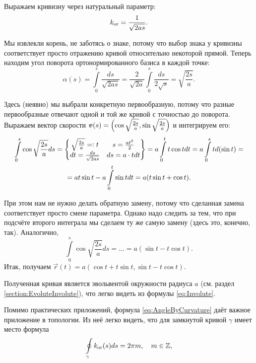 \begin{solution}
	Выражаем кривизну через натуральный параметр:
	\[
		k_{\mathrm{or}} = \frac{1}{\sqrt{2as}}.
	\]

	Мы извлекли корень, не заботясь о знаке, потому что выбор знака у кривизны соответствует просто отражению кривой относительно некоторой прямой. Теперь находим угол поворота ортонормированного базиса в каждой точке:
	\[
		\alpha(s) = \int\limits_0^s\frac{ds}{\sqrt{2as}} = \frac{2}{\sqrt{2a}}\int\limits_0^s\frac{ds}{2\sqrt{s}} = \sqrt{\frac{2s}{a}}.
	\]

	Здесь (неявно) мы выбрали конкретную первообразную, потому что разные первообразные отвечают одной и той же кривой с точностью до поворота. Выражаем вектор скорости $\boldsymbol{v}(s) = \left(\cos\sqrt{\frac{2s}{a}}, \sin\sqrt{\frac{2s}{a}}\right)$ и интегрируем его:
	\begin{multline*}
		\int\limits_0^s\cos\sqrt{\frac{2s}{a}}ds = \left\{
			\begin{matrix}
				\sqrt{\frac{2s}{a}} = \vcentcolon t & s = \frac{at^2}{2} \\
				dt = \frac{ds}{\sqrt{2as}} & ds = a \cdot t dt
			\end{matrix}
			\right\} = a\int\limits_0^tt\cos t dt = a\int\limits_0^std(\sin t) =\\ = a t\sin t - a\int\limits_0^t\sin tdt = a(t\sin t + \cos t).
	\end{multline*}

	При этом нам не нужно делать обратную замену, потому что сделанная замена соответствует просто смене параметра. Однако надо следить за тем, что при подсчёте второго интеграла мы сделаем ту же самую замену (здесь это, конечно, так). Аналогично,
	\[
		\int\limits_0^s\cos\sqrt{\frac{2s}{a}}ds = \ldots = a(\sin t - t\cos t).
	\]
	Итак, получаем $\vec{r}(t) = a(\cos t + t \sin t, \sin t - t \cos t)$.
\end{solution}

Полученная кривая является эвольвентой окружности радиуса $a$ (см. раздел \ref{section:EvoluteInvolute}), что легко видеть из формулы \eqref{eq:Involute}.

Помимо практических приложений, формула \eqref{eq:AngleByCurvature} даёт важное приложение в топологии. Из неё легко видеть, что для замкнутой кривой $\gamma$ имеет место формула
\begin{equation} \label{eq:HomoTopInvariant}
	\oint\limits_{\gamma}k_{\mathrm{or}}(s)ds = 2\pi m,\quad m \in \mathbb{Z},
\end{equation}

